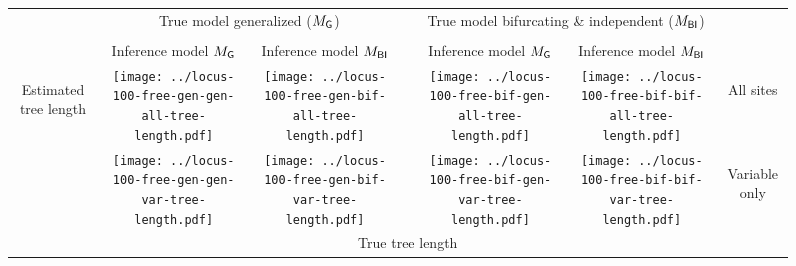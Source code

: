 \documentclass[border=10pt,varwidth=30cm]{standalone}
\newcommand{\genmodel}{\ensuremath{M_{\textrm{\sffamily G}}}\xspace}
\newcommand{\bimodel}{\ensuremath{M_{\textrm{\sffamily BI}}}\xspace}
\begin{document}
\begin{figure}
    \setlength\arrayrulewidth{2pt}
    \centering
    \begin{tabular}{@{}ccccccc@{}}
        & \multicolumn{2}{c}{\LARGE True model generalized (\genmodel)}
        &
        & \multicolumn{2}{c}{\LARGE True model bifurcating \& independent (\bimodel)}
        & \\[1ex]
        \cline{2-3}\cline{5-6}
        & & & & & & \\
        & \multirow{1}{0.19\textwidth}{\centering\Large Inference model \genmodel}
        & \multirow{1}{0.19\textwidth}{\centering\Large Inference model \bimodel}
        &
        & \multirow{1}{0.19\textwidth}{\centering\Large Inference model \genmodel}
        & \multirow{1}{0.19\textwidth}{\centering\Large Inference model \bimodel}
        & \\[4ex]
        \multirow{2}{*}[5em]{\begin{sideways}\Large Estimated tree length\end{sideways}}
        & \texttt{[image: ../locus-100-free-gen-gen-all-tree-length.pdf]}
        & \texttt{[image: ../locus-100-free-gen-bif-all-tree-length.pdf]}
        &
        & \texttt{[image: ../locus-100-free-bif-gen-all-tree-length.pdf]}
        & \texttt{[image: ../locus-100-free-bif-bif-all-tree-length.pdf]}
        & \multirow{1}{*}[9em]{\begin{sideways}\Large All sites\end{sideways}} \\
        & \texttt{[image: ../locus-100-free-gen-gen-var-tree-length.pdf]}
        & \texttt{[image: ../locus-100-free-gen-bif-var-tree-length.pdf]}
        &
        & \texttt{[image: ../locus-100-free-bif-gen-var-tree-length.pdf]}
        & \texttt{[image: ../locus-100-free-bif-bif-var-tree-length.pdf]}
        & \multirow{1}{*}[10em]{\begin{sideways}\Large Variable only\end{sideways}} \\
        & \multicolumn{5}{c}{\Large True tree length} & \\
    \end{tabular}
\end{figure}
\end{document}
